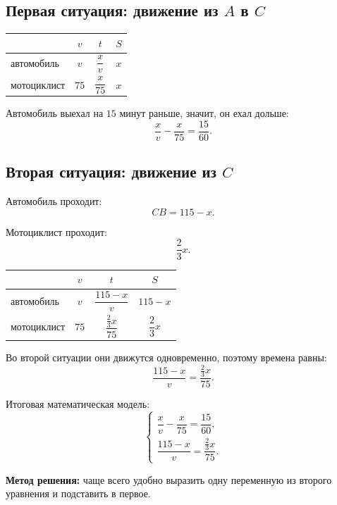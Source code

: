 \documentclass[a4paper,12pt]{article}
\newcommand{\important}[1]{\textcolor{darkaccent}{\textbf{#1}}}
\begin{document}
\subsection*{Первая ситуация: движение из $A$ в $C$}

\begin{center}
\renewcommand{\arraystretch}{1.35}
\begin{tabularx}{0.82\linewidth}{X c c c}
\toprule
 & $v$ & $t$ & $S$ \\
\midrule
автомобиль & $v$ & $\dfrac{x}{v}$ & $x$ \\
мотоциклист & $75$ & $\dfrac{x}{75}$ & $x$ \\
\bottomrule
\end{tabularx}
\end{center}

Автомобиль выехал на $15$ минут раньше, значит, он ехал дольше:
\[
\frac{x}{v}-\frac{x}{75}=\frac{15}{60}.
\]

\subsection*{Вторая ситуация: движение из $C$}

Автомобиль проходит:
\[
CB=115-x.
\]

Мотоциклист проходит:
\[
\frac{2}{3}x.
\]

\begin{center}
\renewcommand{\arraystretch}{1.35}
\begin{tabularx}{0.82\linewidth}{X c c c}
\toprule
 & $v$ & $t$ & $S$ \\
\midrule
автомобиль & $v$ & $\dfrac{115-x}{v}$ & $115-x$ \\
мотоциклист & $75$ & $\dfrac{\frac{2}{3}x}{75}$ & $\dfrac{2}{3}x$ \\
\bottomrule
\end{tabularx}
\end{center}

Во второй ситуации они движутся одновременно, поэтому времена равны:
\[
\frac{115-x}{v}=\frac{\frac{2}{3}x}{75}.
\]

Итоговая математическая модель:
\[
\begin{cases}
\dfrac{x}{v}-\dfrac{x}{75}=\dfrac{15}{60},\\[3mm]
\dfrac{115-x}{v}=\dfrac{\frac{2}{3}x}{75}.
\end{cases}
\]

\important{Метод решения:} чаще всего удобно выразить одну переменную из второго уравнения и подставить в первое.
\end{document}
